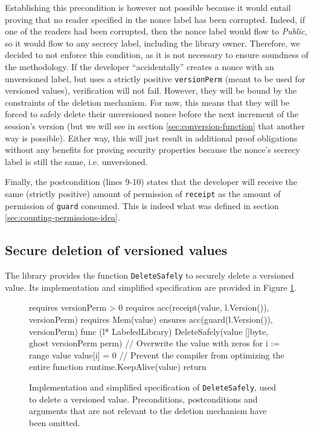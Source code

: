 Establishing this precondition is however not possible because it would entail proving that no reader specified in the nonce label has been corrupted. Indeed, if one of the readers had been corrupted, then the nonce label would flow to \emph{Public}, so it would flow to any secrecy label, including the library owner.
Therefore, we decided to not enforce this condition, as it is not necessary to ensure soundness of the methodology.
If the developer “accidentally” creates a nonce with an unversioned label, but uses a strictly positive \texttt{versionPerm} (meant to be used for versioned values), verification will not fail.
However, they will be bound by the constraints of the deletion mechanism. For now, this means that they will be forced to safely delete their unversioned nonce before the next increment of the session's version (but we will see in section \ref{sec:conversion-function} that another way is possible).
Either way, this will just result in additional proof obligations without any benefits for proving security properties because the nonce's secrecy label is still the same, i.e. unversioned.

Finally, the postcondition (lines 9-10) states that the developer will receive the same (strictly positive) amount of permission of \texttt{receipt} as the amount of permission of \texttt{guard} consumed. This is indeed what was defined in section \ref{sec:counting-permissions-idea}.

\subsection{Secure deletion of versioned values}
\label{sec:secure-deletion-of-versioned-values}

The library provides the function \texttt{DeleteSafely} to securely delete a versioned value. Its implementation and simplified specification are provided in Figure \ref{lst:delete-safely}.

\begin{figure}
    \begin{gobra}
requires versionPerm > 0
requires acc(receipt(value, l.Version()), versionPerm)
requires Mem(value)
ensures  acc(guard(l.Version()), versionPerm)
func (l* LabeledLibrary) DeleteSafely(value []byte,
    ghost versionPerm perm) {
    // Overwrite the value with zeros
    for i := range value {
        value[i] = 0
    }
    // Prevent the compiler from optimizing the entire function
    runtime.KeepAlive(value)
    return
}
    \end{gobra}
    \caption{Implementation and simplified specification of \texttt{DeleteSafely}, used to delete a versioned value. Preconditions, postconditions and arguments that are not relevant to the deletion mechanism have been omitted.}
    \label{lst:delete-safely}
\end{figure}

